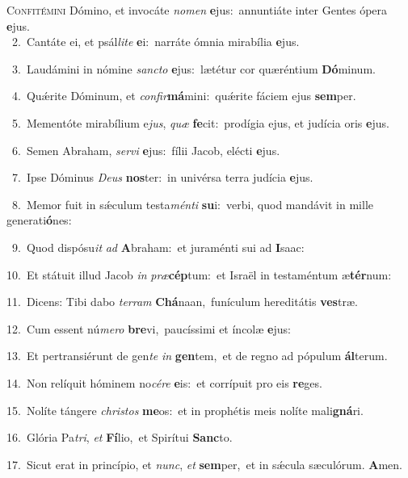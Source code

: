 \lettrine{\initial\textcolor{\initialcolor}{C}}{onfitémini} Dómino, et invocáte \textit{no}\-\textit{men} \textbf{e}\-jus:~\star annuntiáte inter Gentes ópera \textbf{e}\-jus.\\
{\numbfont\textcolor{\numbcolor}{~2.}}~Cantáte ei, et psál\-\textit{li}\-\textit{te} \textbf{e}\-i:~\star narráte ómnia mirabília \textbf{e}\-jus.\par
{\numbfont\textcolor{\numbcolor}{~3.}}~Laudámini in nómine \textit{sanc}\-\textit{to} \textbf{e}\-jus:~\star lætétur cor quæréntium \textbf{Dó}\-minum.\par
{\numbfont\textcolor{\numbcolor}{~4.}}~Quǽrite Dóminum, et \textit{con}\-\textit{fir}\textbf{má}mini:~\star quǽrite fáciem ejus \textbf{sem}\-per.\par
{\numbfont\textcolor{\numbcolor}{~5.}}~Mementóte mirabílium e\-\textit{jus}\-, \textit{quæ} \textbf{fe}\-cit:~\star prodígia ejus, et judícia oris \textbf{e}\-jus.\par
{\numbfont\textcolor{\numbcolor}{~6.}}~Semen Abraham, \textit{ser}\-\textit{vi} \textbf{e}\-jus:~\star fílii Jacob, elécti \textbf{e}\-jus.\par
{\numbfont\textcolor{\numbcolor}{~7.}}~Ipse Dóminus \textit{De}\-\textit{us} \textbf{nos}\-ter:~\star in univérsa terra judícia \textbf{e}\-jus.\par
{\numbfont\textcolor{\numbcolor}{~8.}}~Memor fuit in sǽculum testa\-\textit{mén}\-\textit{ti} \textbf{su}\-i:~\star verbi, quod mandávit in mille generati\-\textbf{ó}\-nes:\par
{\numbfont\textcolor{\numbcolor}{~9.}}~Quod dispósu\textit{it} \textit{ad} \textbf{A}\-braham:~\star et juraménti sui ad \textbf{I}\-saac:\par
{\numbfont\textcolor{\numbcolor}{10.}}~Et státuit illud Jacob \textit{in} \textit{præ}\-\textbf{cép}tum:~\star et Israël in testaméntum æ\-\textbf{tér}\-num:\par
{\numbfont\textcolor{\numbcolor}{11.}}~Dicens: Tibi dabo \textit{ter}\-\textit{ram} \textbf{Chá}\-naan,~\star funículum hereditátis \textbf{ves}\-træ.\par
{\numbfont\textcolor{\numbcolor}{12.}}~Cum essent nú\-\textit{me}\-\textit{ro} \textbf{bre}\-vi,~\star paucíssimi et íncolæ \textbf{e}\-jus:\par
{\numbfont\textcolor{\numbcolor}{13.}}~Et pertransiérunt de gen\textit{te} \textit{in} \textbf{gen}\-tem,~\star et de regno ad pópulum \textbf{ál}\-terum.\par
{\numbfont\textcolor{\numbcolor}{14.}}~Non relíquit hóminem no\-\textit{cé}\-\textit{re} \textbf{e}\-is:~\star et corrípuit pro eis \textbf{re}\-ges.\par
{\numbfont\textcolor{\numbcolor}{15.}}~Nolíte tángere \textit{chris}\-\textit{tos} \textbf{me}\-os:~\star et in prophétis meis nolíte mali\-\textbf{gná}\-ri.\par
{\numbfont\textcolor{\numbcolor}{16.}}~Glória Pa\-\textit{tri}\-, \textit{et} \textbf{Fí}\-lio,~\star et Spirítui \textbf{Sanc}\-to.\par
{\numbfont\textcolor{\numbcolor}{17.}}~Sicut erat in princípio, et \textit{nunc}\-, \textit{et} \textbf{sem}\-per,~\star et in sǽcula sæculórum. \textbf{A}\-men.\par
